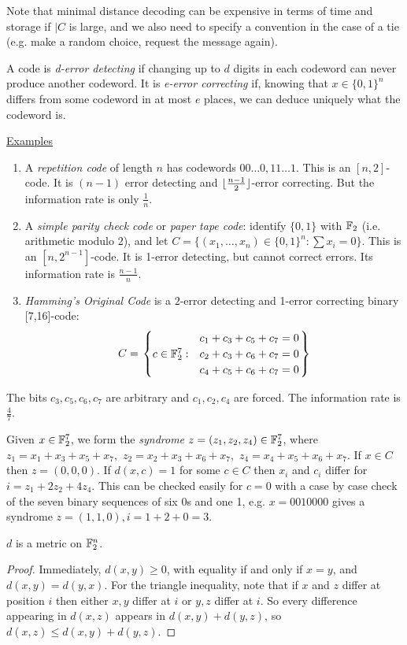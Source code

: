 \documentclass[10pt,a4paper]{article}
\begin{document}
Note that minimal distance decoding can be expensive in terms of time and storage if $|C$ is large, and we also need to specify a convention in the case of a tie (e.g. make a random choice, request the message again).

A code is \emph{d-error detecting} if changing up to $d$ digits in each codeword can never produce another codeword. It is \emph{e-error correcting} if, knowing that $x \in \{0,1\}^n$ differs from some codeword in at most $e$ places, we can deduce uniquely what the codeword is.

\hspace*{-1em}\underline{Examples}
\begin{enumerate}
\item A \emph{repetition code} of length $n$ has codewords $00\ldots0, 11\ldots1$. This is an $[n,2]$-code. It is $(n-1)$ error detecting and $\lfloor \frac{n-1}{2} \rfloor$-error correcting. But the information rate is only $\frac1n$.
\item A \emph{simple parity check code} or \emph{paper tape code}: identify $\{0,1\}$ with $\mathbb{F}_2$ (i.e. arithmetic modulo 2), and let $C = \{(x_1,\ldots, x_n)\in \{0,1\}^n : \sum x_i = 0\}$. This is an $[n, 2^{n-1}]$-code. It is 1-error detecting, but cannot correct errors. Its information rate is $\frac{n-1}{n}$.
\item \emph{Hamming's Original Code} is a $2$-error detecting and 1-error correcting binary [7,16]-code:
\begin{align*}
C = \left.\begin{cases} & c_1+c_3+c_5+c_7 = 0\\ c \in \mathbb{F}_2^7 : & c_2+c_3+c_6+c_7 = 0\\ &c_4+c_5+c_6+c_7 = 0\end{cases}\right\}
\end{align*}
\end{enumerate}
The bits $c_3,c_5,c_6,c_7$ are arbitrary and $c_1, c_2, c_4$ are forced. The information rate is $\frac47$.

Given $x \in \mathbb{F}_2^7$, we form the \emph{syndrome} $z = (z_1,z_2,z_4) \in \mathbb{F}_2^7$, where $z_1 = x_1+x_3+x_5+x_7,$ $z_2 = x_2+x_3+x_6+x_7,$ $z_4 = x_4+x_5+x_6+x_7$. If $x \in C$ then $z = (0,0,0)$. If $d(x,c) = 1$ for some $c \in C$ then $x_i$ and $c_i$ differ for $i = z_1 + 2z_2 + 4z_4$. This can be checked easily for $c=0$ with a case by case check of the seven binary sequences of six 0s and one 1, e.g. $x=0010000$ gives a syndrome $z = (1,1,0), i = 1+2+0 = 3$.

\begin{lemma}
$d$ is a metric on $\mathbb{F}_2^n$.
\end{lemma}
\begin{proof}
Immediately, $d(x,y) \geq 0$, with equality if and only if $x=y$, and $d(x,y)=d(y,x)$. For the triangle inequality, note that if $x$ and $z$ differ at position $i$ then either $x,y$ differ at $i$ or $y,z$ differ at $i$. So every difference appearing in $d(x,z)$ appears in $d(x,y)+d(y,z)$, so $d(x,z) \leq d(x,y)+d(y,z)$.
\end{proof}
\end{document}

